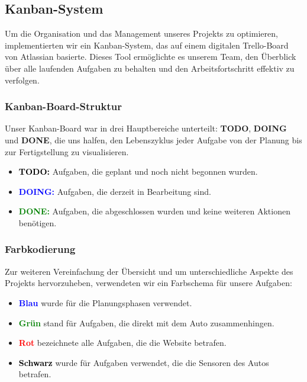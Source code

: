 \subsection{Kanban-System}
Um die Organisation und das Management unseres Projekts zu optimieren, implementierten wir ein Kanban-System, das auf einem digitalen Trello-Board von Atlassian basierte. Dieses Tool ermöglichte es unserem Team, den Überblick über alle laufenden Aufgaben zu behalten und den Arbeitsfortschritt effektiv zu verfolgen.

\subsubsection{Kanban-Board-Struktur}
Unser Kanban-Board war in drei Hauptbereiche unterteilt: \textbf{TODO}, \textbf{DOING} und \textbf{DONE}, die uns halfen, den Lebenszyklus jeder Aufgabe von der Planung bis zur Fertigstellung zu visualisieren. 
\begin{itemize}
    \item \textbf{\textcolor{black}{TODO:}} Aufgaben, die geplant und noch nicht begonnen wurden.
    \item \textbf{\textcolor{blue}{DOING:}} Aufgaben, die derzeit in Bearbeitung sind.
    \item \textbf{\textcolor{green}{DONE:}} Aufgaben, die abgeschlossen wurden und keine weiteren Aktionen benötigen.
\end{itemize}

\subsubsection{Farbkodierung}
Zur weiteren Vereinfachung der Übersicht und um unterschiedliche Aspekte des Projekts hervorzuheben, verwendeten wir ein Farbschema für unsere Aufgaben:
\begin{itemize}
    \item \textcolor{blue}{\textbf{Blau}} wurde für die Planungsphasen verwendet.
    \item \textcolor{green}{\textbf{Grün}} stand für Aufgaben, die direkt mit dem Auto zusammenhingen.
    \item \textcolor{red}{\textbf{Rot}} bezeichnete alle Aufgaben, die die Website betrafen.
    \item \textcolor{black}{\textbf{Schwarz}} wurde für Aufgaben verwendet, die die Sensoren des Autos betrafen.
\end{itemize}

